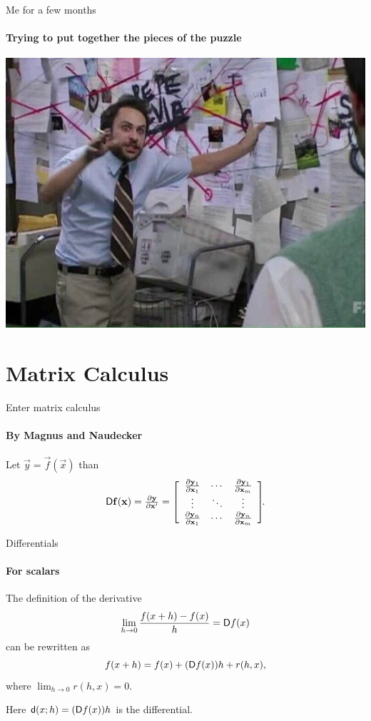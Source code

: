\documentclass[noamsthm]{beamer}
\begin{document}
\begin{frame}{Me for a few months}
\framesubtitle{Trying to put together the pieces of the puzzle}
\centering
\includegraphics[height=\textheight]{res/pepesilvia.jpg}
\end{frame}

\section{Matrix Calculus}

\begin{frame}{Enter matrix calculus}
\framesubtitle{By Magnus and Naudecker~\cite{magnus2019}}
Let \(\vec y=\vec f(\vec x)\) than
\[
    \mathop{}\!\mathsf D\mathbf{f}(\mathbf{x})
    = \textstyle\frac{\partial\mathbf{y}}{\partial\mathbf{x}'}
    = \left[\begin{array}{ccc}
        \textstyle\frac{\partial\mathbf{y}_1}{\partial\mathbf{x}_1} & \cdots & \textstyle\frac{\partial\mathbf{y}_1}{\partial\mathbf{x}_m} \\
        \vdots & \ddots & \vdots \\
        \textstyle\frac{\partial\mathbf{y}_n}{\partial\mathbf{x}_1} & \cdots & \textstyle\frac{\partial\mathbf{y}_n}{\partial\mathbf{x}_m}
    \end{array}\right]\!\!.
\] 
\end{frame}

\begin{frame}{Differentials}
\framesubtitle{For scalars}
The definition of the derivative
\[\lim_{h \to 0} \frac{f(x + h) - f(x)}h = \mathop{}\!\mathsf D f(x)\]
can be rewritten as
\[f(x + h) = f(x) + (\mathop{}\!\mathsf D f(x))h + r(h,x),\]
where \(\lim_{h \to 0} r(h,x) = 0.\)

Here \(\mathop{}\!\mathsf d(x;h) = (\mathop{}\!\mathsf D f(x))h\) is the differential.
\end{frame}
\end{document}
